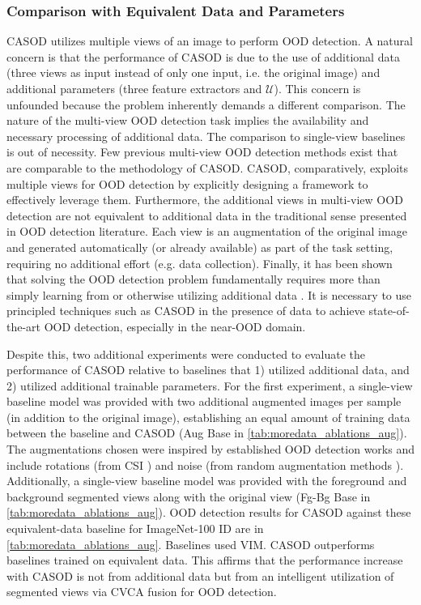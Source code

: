 \subsubsection{Comparison with Equivalent Data and Parameters}
\label{sec:suppmat-eqparam}
CASOD utilizes multiple views of an image to perform OOD detection. A natural concern is that the performance of CASOD is due to the use of additional data (three views as input instead of only one input, i.e. the original image) and additional parameters (three feature extractors and $\mathcal{U}$). This concern is unfounded because the problem inherently demands a different comparison. The nature of the multi-view OOD detection task implies the availability and necessary processing of additional data. The comparison to single-view baselines is out of necessity. Few previous multi-view OOD detection methods exist that are comparable to the methodology of CASOD. CASOD, comparatively, exploits multiple views for OOD detection by explicitly designing a framework to effectively leverage them. Furthermore, the additional views in multi-view OOD detection are not equivalent to additional data in the traditional sense presented in OOD detection literature. Each view is an augmentation of the original image and generated automatically (or already available) as part of the task setting, requiring no additional effort (e.g. data collection). Finally, it has been shown that solving the OOD detection problem fundamentally requires more than simply learning from or otherwise utilizing additional data \cite{fang2022out}. It is necessary to use principled techniques such as CASOD in the presence of data to achieve state-of-the-art OOD detection, especially in the near-OOD domain.

Despite this, two additional experiments were conducted to evaluate the performance of CASOD relative to baselines that 1) utilized additional data, and 2) utilized additional trainable parameters.
For the first experiment, a single-view baseline model was provided with two additional augmented images per sample (in addition to the original image), establishing an equal amount of training data between the baseline and CASOD (Aug Base in \ref{tab:moredata_ablations_aug}). The augmentations chosen were inspired by established OOD detection works and include rotations (from CSI \cite{tack2020csi}) and noise (from random augmentation methods \cite{cubuk2020randaugment}). Additionally, a single-view baseline model was provided with the foreground and background segmented views along with the original view (Fg-Bg Base in \ref{tab:moredata_ablations_aug}). OOD detection results for CASOD against these equivalent-data baseline for ImageNet-100 ID are in \ref{tab:moredata_ablations_aug}. Baselines used VIM. CASOD outperforms baselines trained on equivalent data. This affirms that the performance increase with CASOD is not from additional data but from an intelligent utilization of segmented views via CVCA fusion for OOD detection.

